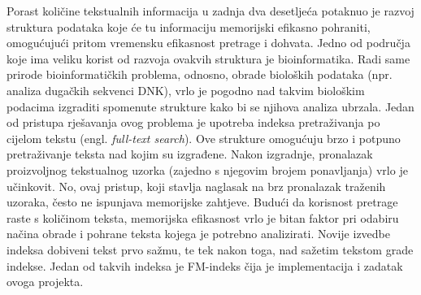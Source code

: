Porast količine tekstualnih informacija u zadnja dva desetljeća potaknuo je razvoj struktura podataka koje će tu informaciju memorijski efikasno pohraniti, omogućujući pritom vremensku efikasnost pretrage i dohvata. Jedno od područja koje ima veliku korist od razvoja ovakvih struktura je bioinformatika. Radi same prirode bioinformatičkih problema, odnosno, obrade bioloških podataka (npr. analiza dugačkih sekvenci DNK), vrlo je pogodno nad takvim biološkim podacima izgraditi spomenute strukture kako bi se njihova analiza ubrzala.
Jedan od pristupa rješavanja ovog problema je upotreba indeksa pretraživanja po cijelom tekstu (engl. \emph{full-text search}). Ove strukture omogućuju brzo i potpuno pretraživanje teksta nad kojim su izgrađene. Nakon izgradnje, pronalazak proizvoljnog tekstualnog uzorka (zajedno s njegovim brojem ponavljanja) vrlo je učinkovit. No, ovaj pristup, koji stavlja naglasak na brz pronalazak traženih uzoraka, često ne ispunjava memorijske zahtjeve. Budući da korisnost pretrage raste s količinom teksta, memorijska efikasnost vrlo je bitan faktor pri odabiru načina obrade i pohrane teksta kojega je potrebno analizirati.
Novije izvedbe indeksa dobiveni tekst prvo sažmu, te tek nakon toga, nad sažetim tekstom grade indekse. Jedan od takvih indeksa je FM-indeks čija je implementacija i zadatak ovoga projekta.
